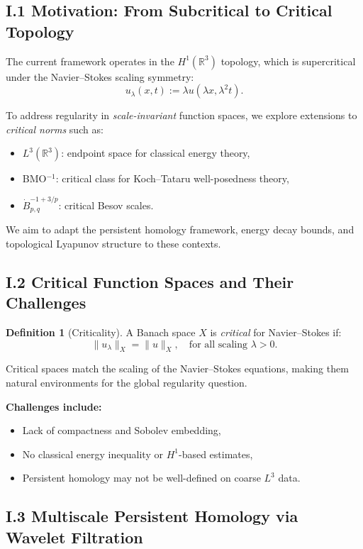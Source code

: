 \documentclass[11pt]{article}
\theoremstyle{definition}
\newtheorem{definition}[theorem]{Definition}
\begin{document}
\subsection*{I.1 Motivation: From Subcritical to Critical Topology}

The current framework operates in the $H^1(\mathbb{R}^3)$ topology, which is supercritical under the Navier--Stokes scaling symmetry:
\[ u_\lambda(x, t) := \lambda u(\lambda x, \lambda^2 t). \]

To address regularity in \emph{scale-invariant} function spaces, we explore extensions to \emph{critical norms} such as:

\begin{itemize}
  \item $L^3(\mathbb{R}^3)$: endpoint space for classical energy theory,
  \item BMO$^{-1}$: critical class for Koch--Tataru well-posedness theory,
  \item $\dot{B}^{-1+3/p}_{p,q}$: critical Besov scales.
\end{itemize}

We aim to adapt the persistent homology framework, energy decay bounds, and topological Lyapunov structure to these contexts.

\subsection*{I.2 Critical Function Spaces and Their Challenges}

\begin{definition}[Criticality]
A Banach space $X$ is \emph{critical} for Navier--Stokes if:
\[ \|u_\lambda\|_X = \|u\|_X, \quad \text{for all scaling } \lambda > 0. \]
\end{definition}

Critical spaces match the scaling of the Navier--Stokes equations, making them natural environments for the global regularity question.

\textbf{Challenges include:}
\begin{itemize}
  \item Lack of compactness and Sobolev embedding,
  \item No classical energy inequality or $H^1$-based estimates,
  \item Persistent homology may not be well-defined on coarse $L^3$ data.
\end{itemize}

\subsection*{I.3 Multiscale Persistent Homology via Wavelet Filtration}
\end{document}
